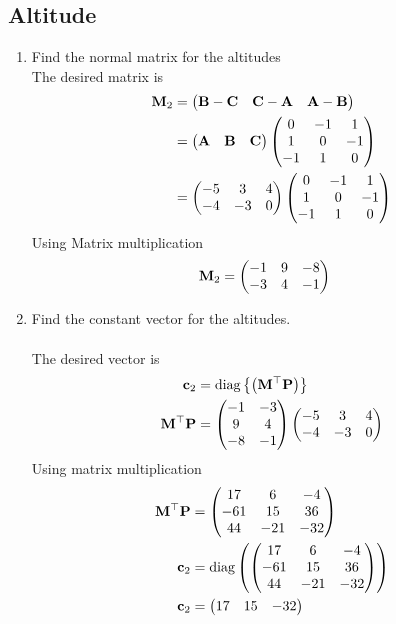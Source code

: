 \documentclass[10pt]{book}
\begin{document}
\subsection{Altitude}
\begin{enumerate}[label=\thesubsection.\arabic*.,ref=\thesubsection.\theenumi]
\item Find the normal matrix for the altitudes \\
\solution  The desired matrix is 
\begin{align}
\mathbf{M}_2 &= \begin{pmatrix}\mathbf{B}-\mathbf{C} & \mathbf{C}-\mathbf{A} & \mathbf{A}-\mathbf{B} \end{pmatrix}
\\
&= 
\begin{pmatrix}\mathbf{A} & \mathbf{B} &\mathbf{C}\end{pmatrix}
\begin{pmatrix} 0 & -1 & 1 \\ 1 & 0 & -1 \\ -1 & 1 & 0\end{pmatrix} \\
&= 
\begin{pmatrix}-5 & 3 & 4 \\ -4 & -3 & 0\end{pmatrix}
\begin{pmatrix} 0 & -1 & 1 \\ 1 & 0 & -1 \\ -1 & 1 & 0\end{pmatrix}
\end{align}
Using Matrix multiplication 
\begin{align}
   \mathbf{M}_2 &=\begin{pmatrix}-1 & 9 & -8 \\ -3 & 4 & -1\end{pmatrix}
\end{align}
\item Find the constant vector for the altitudes. \\
\solution\\
The desired vector is 
\begin{align}
\mathbf{c}_2 &= \text{diag}\left\{\left(\mathbf{M}^{\top}\mathbf{P}\right)\right\} \\
\mathbf{M}^{\top}\mathbf{P} &= \begin{pmatrix}-1&-3 \\ 9&4 \\ -8 &-1\end{pmatrix}\begin{pmatrix}-5 & 3 & 4 \\ -4 & -3 & 0\end{pmatrix} \\
\end{align}
Using matrix multiplication
\begin{align}
 \mathbf{M}^{\top}\mathbf{P}    &=\begin{pmatrix} 17 & 6 & -4 \\ -61 & 15 & 36 \\ 44 & -21 & -32 \end{pmatrix} \\
    \mathbf{c}_2 &= \text{diag}\left( \begin{pmatrix} 17 & 6 & -4 \\ -61 & 15 & 36 \\ 44 & -21 & -32 \end{pmatrix} \right) \\
 \mathbf{c}_2   &= \begin{pmatrix} 17 & 15 & -32\end{pmatrix}
\end{align}
\end{enumerate}
\end{document}
